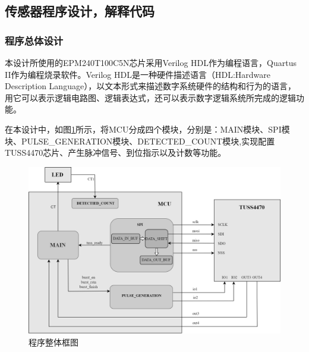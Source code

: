     
    \subsection{传感器程序设计，解释代码}
    \subsubsection{程序总体设计}
    本设计所使用的EPM240T100C5N芯片采用Verilog HDL作为编程语言，Quartus II作为编程烧录软件。Verilog HDL是一种硬件描述语言（HDL:Hardware Description Language），以文本形式来描述数字系统硬件的结构和行为的语言，用它可以表示逻辑电路图、逻辑表达式，还可以表示数字逻辑系统所完成的逻辑功能。\par
    在本设计中，如图\ref{程序整体框图}所示，将MCU分成四个模块，分别是：MAIN模块、SPI模块、PULSE\_GENERATION模块、DETECTED\_COUNT模块,实现配置TUSS4470芯片、产生脉冲信号、到位指示以及计数等功能。
    
         \begin{figure}[H]
        \centering
        \includegraphics[width=12cm]{figure/Overall program block diagram.png}
        \songti{}\caption{程序整体框图}
        \label{程序整体框图}
    \end{figure}
    
